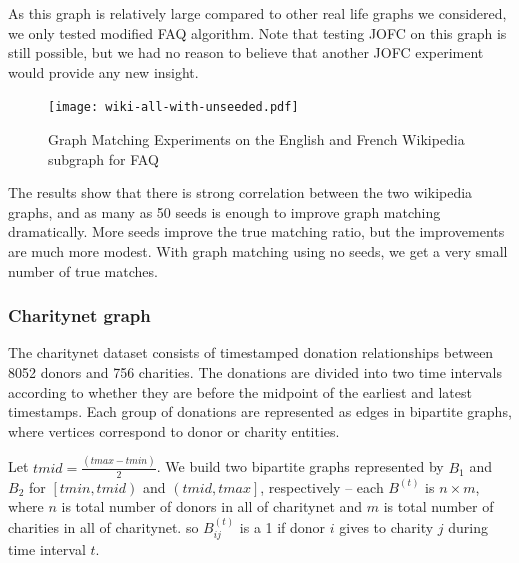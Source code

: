 \documentclass[12pt,oneside,final]{thesis}\usepackage[]{graphicx}\usepackage[]{color}
\begin{document}
 As this graph is relatively large compared to other real life graphs we considered, we only tested modified FAQ algorithm. Note that testing JOFC on this graph is still possible, but we had no reason to believe that another JOFC experiment would provide any new insight.

\begin{figure}
\texttt{[image: wiki-all-with-unseeded.pdf]}
\caption{Graph Matching Experiments on the English and French Wikipedia subgraph for FAQ \label{wiki_graphmatch}}
\end{figure}
      
The results show that there is strong correlation between the two wikipedia graphs, and as many as 50 seeds is enough to improve graph matching dramatically. More seeds improve the true matching ratio,  but the improvements are much more modest. With graph matching using no seeds, we get a very small number of  true matches. 
      
\subsubsection{Charitynet graph}

The charitynet dataset consists  of timestamped donation relationships between 8052 donors and 756 charities. The donations are divided into two time intervals according to whether they are before the midpoint of the earliest and latest timestamps. Each group of donations are represented as edges in bipartite graphs, where vertices correspond to donor or charity entities.

Let $tmid = \frac{(tmax - tmin)}{2}$.
We build two bipartite graphs represented by $B_1$ and $B_2$ for $\left[tmin,tmid\right)$ and $\left(tmid,tmax\right]$, respectively --
each $B^{(t)}$ is $n \times m$, where $n$ is total number of donors in all of charitynet and $m$ is total number of charities in all of charitynet.
so $B_{ij}^{(t)}$ is a 1 if donor $i$ gives to charity $j$ during time interval $t$.
\end{document}
